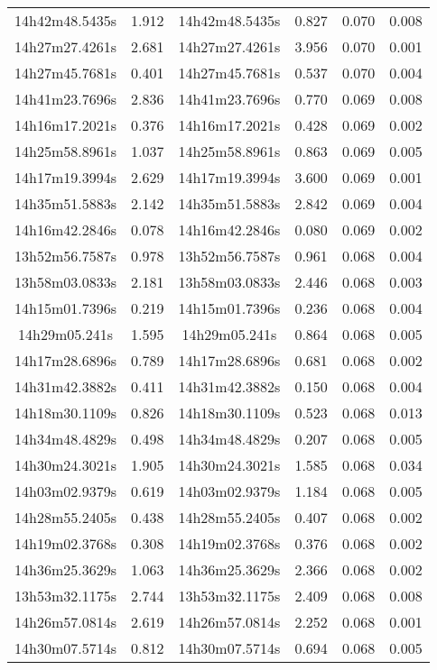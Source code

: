 \begin{table}
\begin{tabular}{cccccc}
14h42m48.5435s & 1.912 & 14h42m48.5435s & 0.827 & 0.070 & 0.008 \\
14h27m27.4261s & 2.681 & 14h27m27.4261s & 3.956 & 0.070 & 0.001 \\
14h27m45.7681s & 0.401 & 14h27m45.7681s & 0.537 & 0.070 & 0.004 \\
14h41m23.7696s & 2.836 & 14h41m23.7696s & 0.770 & 0.069 & 0.008 \\
14h16m17.2021s & 0.376 & 14h16m17.2021s & 0.428 & 0.069 & 0.002 \\
14h25m58.8961s & 1.037 & 14h25m58.8961s & 0.863 & 0.069 & 0.005 \\
14h17m19.3994s & 2.629 & 14h17m19.3994s & 3.600 & 0.069 & 0.001 \\
14h35m51.5883s & 2.142 & 14h35m51.5883s & 2.842 & 0.069 & 0.004 \\
14h16m42.2846s & 0.078 & 14h16m42.2846s & 0.080 & 0.069 & 0.002 \\
13h52m56.7587s & 0.978 & 13h52m56.7587s & 0.961 & 0.068 & 0.004 \\
13h58m03.0833s & 2.181 & 13h58m03.0833s & 2.446 & 0.068 & 0.003 \\
14h15m01.7396s & 0.219 & 14h15m01.7396s & 0.236 & 0.068 & 0.004 \\
14h29m05.241s & 1.595 & 14h29m05.241s & 0.864 & 0.068 & 0.005 \\
14h17m28.6896s & 0.789 & 14h17m28.6896s & 0.681 & 0.068 & 0.002 \\
14h31m42.3882s & 0.411 & 14h31m42.3882s & 0.150 & 0.068 & 0.004 \\
14h18m30.1109s & 0.826 & 14h18m30.1109s & 0.523 & 0.068 & 0.013 \\
14h34m48.4829s & 0.498 & 14h34m48.4829s & 0.207 & 0.068 & 0.005 \\
14h30m24.3021s & 1.905 & 14h30m24.3021s & 1.585 & 0.068 & 0.034 \\
14h03m02.9379s & 0.619 & 14h03m02.9379s & 1.184 & 0.068 & 0.005 \\
14h28m55.2405s & 0.438 & 14h28m55.2405s & 0.407 & 0.068 & 0.002 \\
14h19m02.3768s & 0.308 & 14h19m02.3768s & 0.376 & 0.068 & 0.002 \\
14h36m25.3629s & 1.063 & 14h36m25.3629s & 2.366 & 0.068 & 0.002 \\
13h53m32.1175s & 2.744 & 13h53m32.1175s & 2.409 & 0.068 & 0.008 \\
14h26m57.0814s & 2.619 & 14h26m57.0814s & 2.252 & 0.068 & 0.001 \\
14h30m07.5714s & 0.812 & 14h30m07.5714s & 0.694 & 0.068 & 0.005 \\

\end{tabular}
\end{table}
